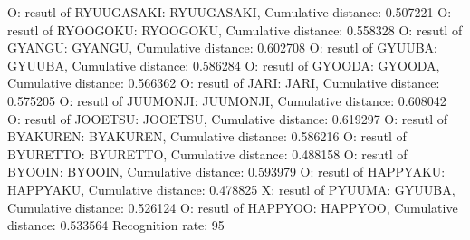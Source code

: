 O: resutl of RYUUGASAKI: RYUUGASAKI, Cumulative distance: 0.507221
O: resutl of RYOOGOKU: RYOOGOKU, Cumulative distance: 0.558328
O: resutl of GYANGU: GYANGU, Cumulative distance: 0.602708
O: resutl of GYUUBA: GYUUBA, Cumulative distance: 0.586284
O: resutl of GYOODA: GYOODA, Cumulative distance: 0.566362
O: resutl of JARI: JARI, Cumulative distance: 0.575205
O: resutl of JUUMONJI: JUUMONJI, Cumulative distance: 0.608042
O: resutl of JOOETSU: JOOETSU, Cumulative distance: 0.619297
O: resutl of BYAKUREN: BYAKUREN, Cumulative distance: 0.586216
O: resutl of BYURETTO: BYURETTO, Cumulative distance: 0.488158
O: resutl of BYOOIN: BYOOIN, Cumulative distance: 0.593979
O: resutl of HAPPYAKU: HAPPYAKU, Cumulative distance: 0.478825
X: resutl of PYUUMA: GYUUBA, Cumulative distance: 0.526124
O: resutl of HAPPYOO: HAPPYOO, Cumulative distance: 0.533564
Recognition rate: 95%
